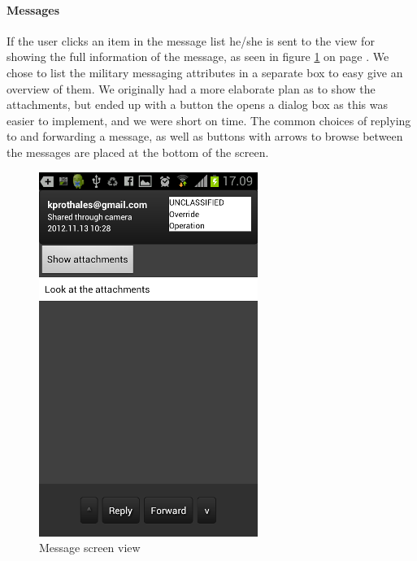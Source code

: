 \paragraph{Messages}\hfill
\newline
If the user clicks an item in the message list he/she is sent to the view for showing the full information of the message, as seen in figure \ref{fig:frontend_message} on page \pageref{fig:frontend_message}. We chose to list the military messaging attributes in a separate box to easy give an overview of them. We originally had a more elaborate plan as to show the attachments, but ended up with a button the opens a dialog box as this was easier to implement, and we were short on time. 
The common choices of replying to and forwarding a message, as well as buttons with arrows to browse between the messages are placed at the bottom of the screen.

\begin{figure}[h!]
\begin{center}
\includegraphics{message_final}
\end{center}
\caption{Message screen view} \label{fig:frontend_message}
\end{figure}

\newpage

